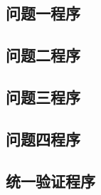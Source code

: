 \documentclass[withoutpreface,bwprint]{cumcm_thesis}
\begin{document}
\begin{appendices}
\subsection{问题一程序}




\subsection{问题二程序}




\subsection{问题三程序}


\subsection{问题四程序}


\subsection{统一验证程序}

\endgroup

\end{appendices}
\end{document}
